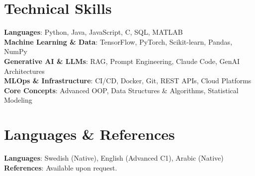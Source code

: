 \documentclass[10pt,a4paper]{article}
\begin{document}
\section{Technical Skills}
 \begin{itemize}[leftmargin=0.0in, label={}]
    \small{\item{
     \textbf{Languages}{: Python, Java, JavaScript, C, SQL, MATLAB} \\
     \textbf{Machine Learning \& Data}{: TensorFlow, PyTorch, Scikit-learn, Pandas, NumPy} \\
     \textbf{Generative AI \& LLMs}{: RAG, Prompt Engineering, Claude Code, GenAI Architectures} \\
     \textbf{MLOps \& Infrastructure}{: CI/CD, Docker, Git, REST APIs, Cloud Platforms} \\
     \textbf{Core Concepts}{: Advanced OOP, Data Structures \& Algorithms, Statistical Modeling}
    }}
 \end{itemize}

\section{Languages \& References}
 \begin{itemize}[leftmargin=0.0in, label={}]
    \small{\item{
     \textbf{Languages}{: Swedish (Native), English (Advanced C1), Arabic (Native)} \\
     \textbf{References}{: Available upon request.}
    }}
 \end{itemize}
\end{document}
